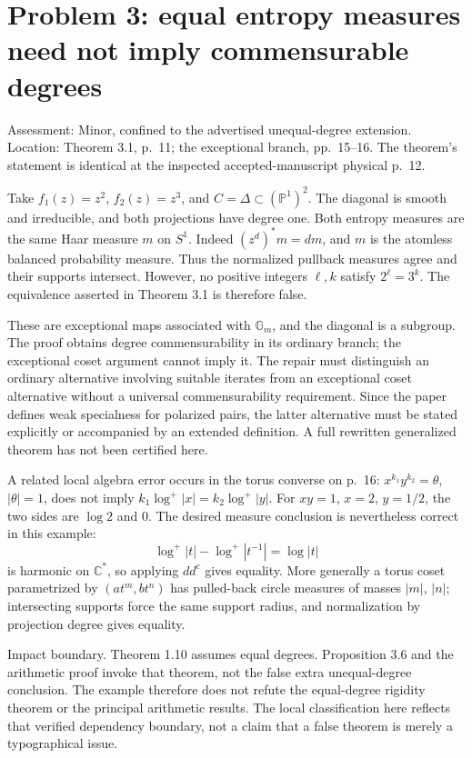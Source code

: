 \documentclass[10pt]{article}
\begin{document}
\section*{Problem 3: equal entropy measures need not imply commensurable degrees}
Assessment: Minor, confined to the advertised unequal-degree extension. Location: Theorem 3.1, p. 11; the exceptional branch, pp. 15–16. The theorem’s statement is identical at the inspected accepted-manuscript physical p. 12.\par
Take \(f_1(z)=z^2\), \(f_2(z)=z^3\), and \(C=\Delta\subset(\mathbb P^1)^2\). The diagonal is smooth and irreducible, and both projections have degree one. Both entropy measures are the same Haar measure \(m\) on \(S^1\). Indeed \((z^d)^*m=dm\), and \(m\) is the atomless balanced probability measure. Thus the normalized pullback measures agree and their supports intersect. However, no positive integers \(\ell,k\) satisfy \(2^\ell=3^k\). The equivalence asserted in Theorem 3.1 is therefore false.\par
These are exceptional maps associated with \(\mathbb G_m\), and the diagonal is a subgroup. The proof obtains degree commensurability in its ordinary branch; the exceptional coset argument cannot imply it. The repair must distinguish an ordinary alternative involving suitable iterates from an exceptional coset alternative without a universal commensurability requirement. Since the paper defines weak specialness for polarized pairs, the latter alternative must be stated explicitly or accompanied by an extended definition. A full rewritten generalized theorem has not been certified here.\par
A related local algebra error occurs in the torus converse on p. 16: \(x^{k_1}y^{k_2}=\theta\), \(|\theta|=1\), does not imply \(k_1\log^+|x|=k_2\log^+|y|\). For \(xy=1\), \(x=2\), \(y=1/2\), the two sides are \(\log2\) and \(0\). The desired measure conclusion is nevertheless correct in this example: \[\log^+|t|-\log^+|t^{-1}|=\log|t|\] is harmonic on \(\mathbb C^*\), so applying \(dd^c\) gives equality. More generally a torus coset parametrized by \((at^m,bt^n)\) has pulled-back circle measures of masses \(|m|\), \(|n|\); intersecting supports force the same support radius, and normalization by projection degree gives equality.\par
Impact boundary. Theorem 1.10 assumes equal degrees. Proposition 3.6 and the arithmetic proof invoke that theorem, not the false extra unequal-degree conclusion. The example therefore does not refute the equal-degree rigidity theorem or the principal arithmetic results. The local classification here reflects that verified dependency boundary, not a claim that a false theorem is merely a typographical issue.\par
\end{document}
